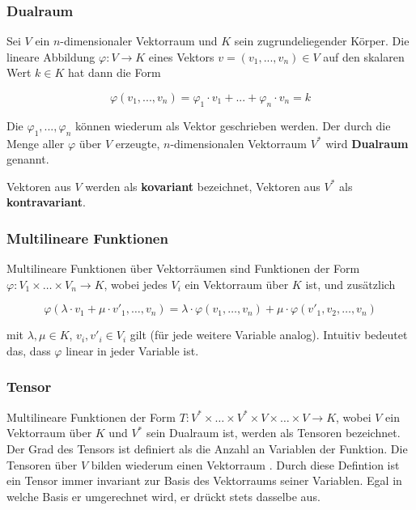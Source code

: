 \documentclass[a4paper,fontsize=12pt,toc=bib,halfparskip]{scrartcl}
\begin{document}
\subsubsection{Dualraum}
Sei $V$ ein $n$-dimensionaler Vektorraum und $K$ sein zugrundeliegender K\"orper. Die lineare Abbildung $\varphi: V \rightarrow K$ eines Vektors $v = (v_1, ..., v_n) \in V$ auf den skalaren Wert $k \in K$ hat dann die Form

\begin{equation}
	\varphi(v_1, ..., v_n) = \varphi_1 \cdot v_1 + ... + \varphi_n \cdot v_n = k
\end{equation}

Die $\varphi_1, ..., \varphi_n$ k\"onnen wiederum als Vektor geschrieben werden. Der durch die Menge aller $\varphi$ \"uber $V$  erzeugte, $n$-dimensionalen Vektorraum $V^*$ wird \textbf{Dualraum} genannt\cite[S.~203]{bowen2008introduction}.

Vektoren aus $V$ werden als \textbf{kovariant} bezeichnet, Vektoren aus $V^*$ als \textbf{kontravariant}\cite[S.~205]{bowen2008introduction}.

\subsubsection{Multilineare Funktionen}
Multilineare Funktionen \"uber Vektorr\"aumen sind Funktionen der Form $\varphi: V_1 \times \dots \times V_n \rightarrow K$, wobei jedes $V_i$ ein Vektorraum \"uber $K$ ist, und zus\"atzlich 

\begin{equation}
	\varphi(\lambda \cdot v_1 + \mu \cdot v'_1, \dots, v_n) = \lambda \cdot \varphi(v_1, \dots, v_n) + \mu \cdot \varphi(v'_1, v_2, \dots, v_n)
\end{equation}

mit $\lambda, \mu \in K$, $v_i, v'_i \in V_i$ gilt (f\"ur jede weitere Variable analog). Intuitiv bedeutet das, dass $\varphi$ linear in jeder Variable ist\cite[S.~204, 218]{bowen2008introduction}.





\subsubsection{Tensor}
Multilineare Funktionen der Form $T: V^*\times\dots\times V^*\times V \times \dots \times V \rightarrow K$, wobei $V$ ein Vektorraum \"uber $K$ und $V^*$ sein Dualraum ist, werden als Tensoren bezeichnet\cite[S.~218]{bowen2008introduction}. Der Grad des Tensors ist definiert als die Anzahl an Variablen der Funktion. Die Tensoren \"uber $V$ bilden wiederum einen Vektorraum \cite[S.~220]{bowen2008introduction}. Durch diese Defintion ist ein Tensor immer invariant zur Basis des Vektorraums seiner Variablen. Egal in welche Basis er umgerechnet wird, er dr\"uckt stets dasselbe aus.
\end{document}
